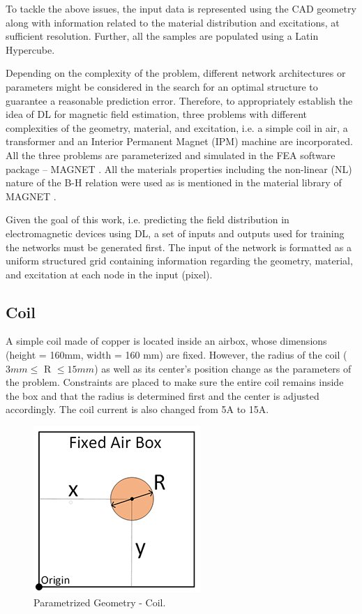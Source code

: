 To tackle the above issues, the input data is represented using the CAD geometry along with information related to the material distribution and excitations, at sufficient resolution. Further, all the samples are populated using a Latin Hypercube.

Depending on the complexity of the problem, different network architectures or parameters might be considered in the search for an optimal structure to guarantee a reasonable prediction error. Therefore, to appropriately establish the idea of DL for magnetic field estimation, three problems with different complexities of the geometry, material, and excitation, i.e. a simple coil in air, a transformer \parencite{Bottauscio} and an Interior Permanent Magnet (IPM) machine \parencite{wang2016neural, ghorbanian2017computer, ghorbanian2017statistical} are incorporated. All the three problems are parameterized and simulated in the FEA software package – MAGNET \parencite{Magnet}. All the materials properties including the non-linear (NL) nature of the B-H relation were used as is mentioned in the material library of MAGNET \parencite{Magnet}. 

Given the goal of this work, i.e. predicting the field distribution in electromagnetic devices using DL, a set of inputs and outputs used for training the networks must be generated first. The input of the network is formatted as a uniform structured grid containing information regarding the geometry, material, and excitation at each node in the input (pixel).

\subsection{Coil}

A simple coil made of copper is located inside an airbox, whose dimensions (height = 160mm, width = 160 mm) are fixed. However, the radius of the coil ($3mm \leq$ R $\leq 15mm$) as well as its center’s position change as the parameters of the problem. Constraints are placed to make sure the entire coil remains inside the box and that the radius is determined first and the center is adjusted accordingly. The coil current is also changed from 5A to 15A.

\begin{figure}[h!]
    \centering
    \includegraphics{Figures/Chp2_CNN/Geo_coil.png}
    \caption{Parametrized Geometry - Coil.}
    \label{fig:CNN_Fig-2_Geo_coil}
\end{figure}

